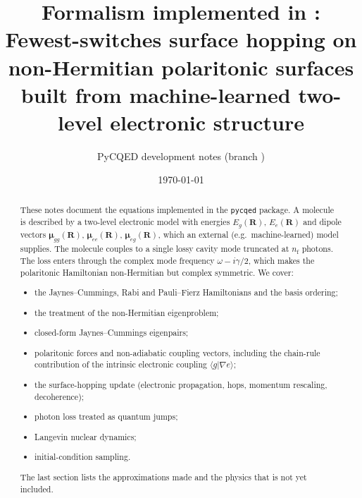 \documentclass[11pt]{article}
\title{Formalism implemented in \code{pycqed}:\\
Fewest-switches surface hopping on non-Hermitian polaritonic surfaces\\
built from machine-learned two-level electronic structure}
\author{PyCQED development notes (branch \code{refactor/ml-polariton-fssh})}
\date{\today}
\newcommand{\braket}[2]{\langle #1 \vert #2 \rangle}
\newcommand{\R}{\mathbf{R}}
\newcommand{\grad}{\nabla}
\newcommand{\mub}{\bm{\mu}}
\newcommand{\code}[1]{\texttt{#1}}
\newcommand{\nf}{n_{\mathrm f}}
\begin{document}
\maketitle

\begin{abstract}
These notes document the equations implemented in the \code{pycqed} package. A molecule is described by a two-level electronic model with energies $E_g(\R)$, $E_e(\R)$ and dipole vectors $\mub_{gg}(\R)$, $\mub_{ee}(\R)$, $\mub_{eg}(\R)$, which an external (e.g.\ machine-learned) model supplies. The molecule couples to a single lossy cavity mode truncated at $\nf$ photons. The loss enters through the complex mode frequency $\omega-i\gamma/2$, which makes the polaritonic Hamiltonian non-Hermitian but complex symmetric. We cover:
\begin{itemize}
\item the Jaynes--Cummings, Rabi and Pauli--Fierz Hamiltonians and the basis ordering;
\item the treatment of the non-Hermitian eigenproblem;
\item closed-form Jaynes--Cummings eigenpairs;
\item polaritonic forces and non-adiabatic coupling vectors, including the chain-rule contribution of the intrinsic electronic coupling $\braket{g}{\grad e}$;
\item the surface-hopping update (electronic propagation, hops, momentum rescaling, decoherence);
\item photon loss treated as quantum jumps;
\item Langevin nuclear dynamics;
\item initial-condition sampling.
\end{itemize}
The last section lists the approximations made and the physics that is not yet included.
\end{abstract}

\tableofcontents

\end{document}
